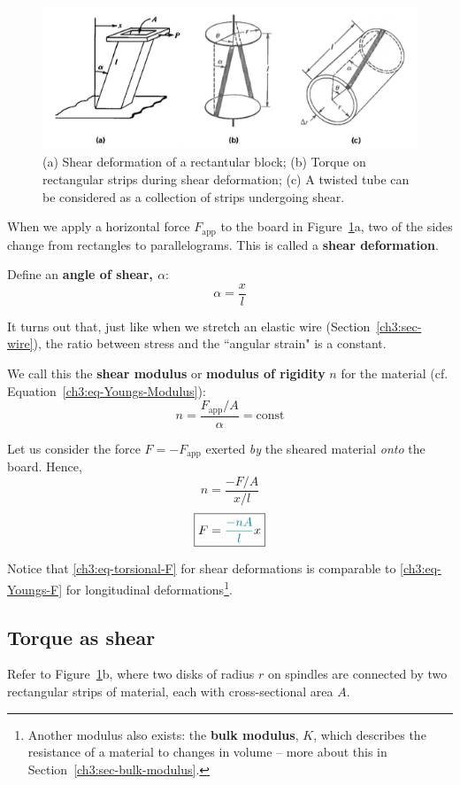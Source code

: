 \begin{figure}
	\centering
	\includegraphics[scale=0.55]{phys232/Ch3-shear-torsion.png}
	\caption{(a) Shear deformation of a rectantular block; (b) Torque on rectangular strips during shear deformation; (c) A twisted tube can be considered as a collection of strips undergoing shear.}
	\label{ch3:fig-shear-torsion}
\end{figure}

When we apply a horizontal force $F_\text{app}$ to the board in Figure~\ref{ch3:fig-shear-torsion}a, two of the sides change from rectangles to parallelograms. This is called a \textbf{shear deformation}.

Define an \textbf{angle of shear, $\alpha$}:
\[ \alpha = \frac{x}{l} \]

It turns out that, just like when we stretch an elastic wire (Section~\ref{ch3:sec-wire}), the ratio between stress and the ``angular strain" is a constant.

We call this the \textbf{shear modulus} or \textbf{modulus of rigidity} $n$ for the material (cf. Equation~\ref{ch3:eq-Youngs-Modulus}):
\[  n= \frac{F_\text{app}/A}{\alpha} = \text{const} \]

Let us consider the force $F=-F_\text{app}$ exerted \emph{by} the sheared material \emph{onto} the board. Hence,
\[  n = \frac{-F/A}{x/l} \]
\begin{equation}
	\boxed{F = \textcolor{teal}{\frac{-nA}{l}} x}  \label{ch3:eq-torsional-F}
\end{equation}

Notice that \eqref{ch3:eq-torsional-F} for {shear deformations} is comparable to \eqref{ch3:eq-Youngs-F} for {longitudinal deformations}\footnote{Another modulus also exists: the \textbf{bulk modulus}, $K$, which describes the resistance of a material to changes in volume -- more about this in Section~\ref{ch3:sec-bulk-modulus}.}.

\subsection{Torque as shear}
Refer to Figure~\ref{ch3:fig-shear-torsion}b, where two disks of radius $r$ on spindles are connected by two rectangular strips of material, each with cross-sectional area $A$.

